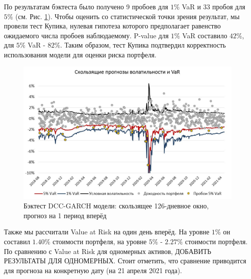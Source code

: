 \documentclass[a4paper,12pt,twoside]{article}
\begin{document}
По результатам бэктеста было получено 9 пробоев для $1\%$ VaR и 33 пробоя для $5\%$ (см. Рис. \ref{fig:backtest}).
Чтобы оценить со статистической точки зрения результат, мы провели тест Купика, нулевая гипотеза которого предполагает равенство ожидаемого числа пробоев наблюдаемому. P-value для $1\%$ VaR составило $42\%$, для $5\%$ VaR - $82\%$. Таким образом, тест Купика подтвердил корректность использования модели для оценки риска портфеля.

  \begin{figure}[h]
      \includegraphics[scale = 0.7]{backtest.jpg}
      \caption{Бэктест DCC-GARCH модели: скользящее 126-дневное окно, \\ прогноз на 1 период вперёд }
      \label{fig:backtest}
  \end{figure}


Также мы рассчитали Value at Risk на один день вперёд. На уровне $1\%$ он составил $1.40\%$ стоимости портфеля, на уровне $5\%$ - $2.27\%$ стоимости портфеля. По сравнению с Value at Risk для одномерных активов, ДОБАВИТЬ РЕЗУЛЬТАТЫ ДЛЯ ОДНОМЕРНЫХ. Стоит отметить, что сравнение приводится для прогноза на конкретную дату (на 21 апреля 2021 года).

\newpage
\end{document}
